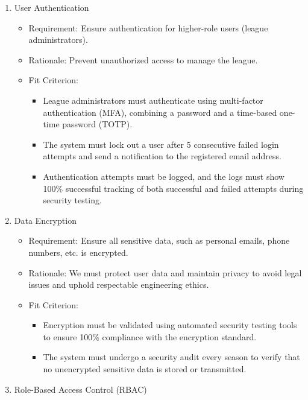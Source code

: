 \documentclass{article}
\begin{document}
\begin{enumerate}
    \item User Authentication
          \begin{itemize}
              \item Requirement: Ensure authentication for higher-role users (league administrators).
              \item Rationale: Prevent unauthorized access to manage the league.
              \item Fit Criterion:
                    \begin{itemize}
                        \item League administrators must authenticate using multi-factor authentication (MFA), combining a password and a time-based one-time password (TOTP).
                        \item The system must lock out a user after 5 consecutive failed login attempts and send a notification to the registered email address.
                        \item Authentication attempts must be logged, and the logs must show 100\% successful tracking of both successful and failed attempts during security testing.
                    \end{itemize}
          \end{itemize}
    \item Data Encryption
          \begin{itemize}
              \item Requirement: Ensure all sensitive data, such as personal emails, phone numbers, etc. is encrypted.
              \item Rationale: We must protect user data and maintain privacy to avoid legal issues and uphold respectable engineering ethics.
              \item Fit Criterion:
                    \begin{itemize}
                        \item Encryption must be validated using automated security testing tools to ensure 100\% compliance with the encryption standard.
                        \item The system must undergo a security audit every season to verify that no unencrypted sensitive data is stored or transmitted.
                    \end{itemize}
          \end{itemize}
    \item Role-Based Access Control (RBAC)

\end{enumerate}
\end{document}
